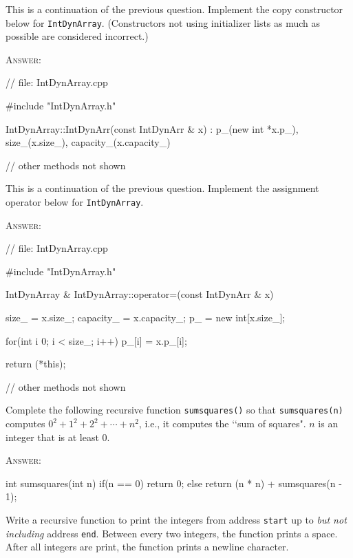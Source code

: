 \newpage
\nextq
This is a continuation of the previous question.
Implement the copy constructor below for \verb!IntDynArray!.
(Constructors not using initializer lists as much as possible are considered
incorrect.)

\textsc{Answer:}
\begin{answercode}
// file: IntDynArray.cpp

#include "IntDynArray.h"

IntDynArray::IntDynArr(const IntDynArr & x)
: p_(new int *x.p_), size_(x.size_), capacity_(x.capacity_) 
{}

// other methods not shown
\end{answercode}


\newpage
\nextq
This is a continuation of the previous question.
Implement the assignment operator below for \verb!IntDynArray!.

\textsc{Answer:}
\begin{answercode}
// file: IntDynArray.cpp

#include "IntDynArray.h"

IntDynArray & IntDynArray::operator=(const IntDynArr & x)
{
  size_ = x.size_;
  capacity_ = x.capacity_;
  p_ = new int[x.size_];

  for(int i 0; i < size_; i++)
  {
    p_[i] = x.p_[i];
  }

  return (*this);
}

// other methods not shown
\end{answercode}


\newpage
\nextq
Complete the following recursive function \verb!sumsquares()! so that
\verb!sumsquares(n)! computes $0^2 + 1^2 + 2^2 + \cdots + n^2$, i.e.,
it computes the \lq\lq sum of squares".
$n$ is an integer that is at least $0$.

\textsc{Answer:}
\begin{answercode}
int sumsquares(int n)
{
  if(n == 0) return 0;
  else return (n * n) + sumsquares(n - 1);
}
\end{answercode}

\newpage
\nextq
Write a recursive function to print the integers from address
\verb!start! up to \textit{but not including} address \verb!end!.
Between every two integers, the function prints a space.
After all integers are print, the function prints a newline character.

